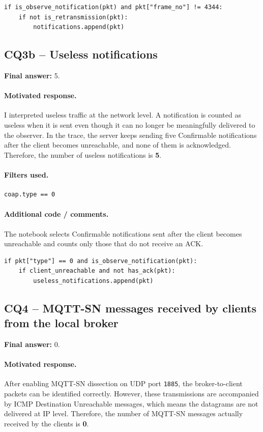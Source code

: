 \documentclass[11pt,a4paper]{article}
\begin{document}
\begin{verbatim}
if is_observe_notification(pkt) and pkt["frame_no"] != 4344:
    if not is_retransmission(pkt):
        notifications.append(pkt)
\end{verbatim}
\subsection*{CQ3b -- Useless notifications}

\textbf{Final answer:} 5.

\paragraph{Motivated response.}
I interpreted useless traffic at the network level. A notification is counted as useless when it is
sent even though it can no longer be meaningfully delivered to the observer. In the trace, the
server keeps sending five Confirmable notifications after the client becomes unreachable, and
none of them is acknowledged. Therefore, the number of useless notifications is \textbf{5}.

\paragraph{Filters used.}
\begin{verbatim}
coap.type == 0
\end{verbatim}

\paragraph{Additional code / comments.}
The notebook selects Confirmable notifications sent after the client becomes unreachable and
counts only those that do not receive an ACK.

\begin{verbatim}
if pkt["type"] == 0 and is_observe_notification(pkt):
    if client_unreachable and not has_ack(pkt):
        useless_notifications.append(pkt)
\end{verbatim}
\subsection*{CQ4 -- MQTT-SN messages received by clients from the local broker}

\textbf{Final answer:} 0.

\paragraph{Motivated response.}
After enabling MQTT-SN dissection on UDP port \texttt{1885}, the broker-to-client packets can
be identified correctly. However, these transmissions are accompanied by ICMP Destination
Unreachable messages, which means the datagrams are not delivered at IP level. Therefore, the
number of MQTT-SN messages actually received by the clients is \textbf{0}.
\end{document}
